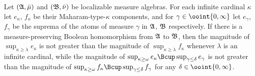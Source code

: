  Let $(\frak A,\bar\mu)$ and $(\frak B,\bar\nu)$ be
localizable measure algebras.   For each infinite cardinal $\kappa$ let
$e_{\kappa}$,
$f_{\kappa}$ be their Maharam-type-$\kappa$ components, and for
$\gamma\in\ooint{0,\infty}$ let $e_{\gamma}$, $f_{\gamma}$ be the
suprema of the atoms of measure $\gamma$ in $\frak A$, $\frak B$
respectively.   If there is a measure-preserving Boolean homomorphism
from $\frak A$ to $\frak B$, then the magnitude of
$\sup_{\kappa\ge\lambda}e_{\kappa}$ is not greater than the magnitude of
$\sup_{\kappa\ge \lambda}f_{\kappa}$ whenever $\lambda$ is an infinite
cardinal, while the magnitude of
$\sup_{\kappa\ge\omega}e_{\kappa}\Bcup\sup_{\gamma\le\delta}e_{\gamma}$
is not greater than the magnitude of
$\sup_{\kappa\ge\omega}f_{\kappa}\Bcup\sup_{\gamma\le\delta}f_{\gamma}$
for any $\delta\in\ooint{0,\infty}$.

